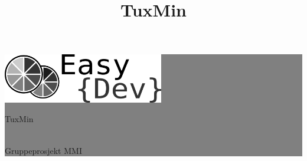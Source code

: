 \setlength{\oddsidemargin}{0mm} %
\setlength{\evensidemargin}{0mm} %

\newcommand{\HRule}[1]{\hfill \rule{0.2\linewidth}{#1}} %



\thispagestyle{empty} %

\vspace*{-5cm}
\hspace*{10.6cm}
\colorbox{grey}{

	\parbox[]{0.28\linewidth}{
		\centering 
		\fontsize{50pt}{80pt}\selectfont %
		\vspace*{19cm} %
		
		\hspace*{-2.4cm}
		\includegraphics[width=70mm]{./img/fremside/logo.png}
		\\
		\vspace*{0.55cm}
		 
		\fontsize{30pt}{50pt}\selectfont 
		{\selectfont 
		\hfill
		TuxMin
		\title{TuxMin}
		}
		\fontsize{10pt}{0pt}\selectfont 
		{\selectfont 
		\\
		\hfill
		Gruppeprosjekt MMI 
		}
		\par
		
		\vspace*{0.5cm} %
	}
}

